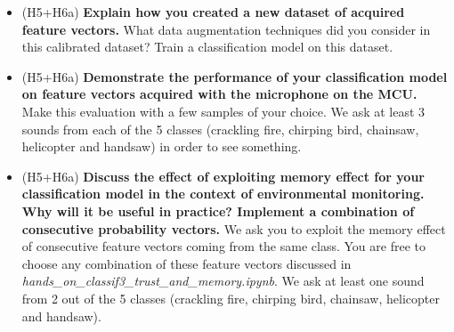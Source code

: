 \begin{itemize}
\begin{enumerate}
    \item acquired via the microphone on the MCU.
   \end{enumerate}
   To help this comparison, we advise you to show the whole melspectrogram on the 5s-long audio signal in Python, and to identify in this whole melspectrogram what is the subpart that is the most related to your acquired melspectrogram with the Nucleo board.
     Use \textbf{a few} representative samples of the dataset to conduct your experiments.
       We ask, for each sample, a (1,3) subplot showing the melspectrograms for cases 1,2,3 from left to right. Please make it clear with titles or captions in your figures.
    \item (H5+H6a) \textbf{Explain how you created a new dataset of acquired feature vectors.} What data augmentation techniques did you consider in this calibrated dataset? Train a classification model on this dataset.
    \item (H5+H6a) \textbf{Demonstrate the performance of your classification model on feature vectors acquired with the microphone on the MCU.}
    Make this evaluation with a few samples of your choice. We ask at least 3 sounds from each of the 5 classes (crackling fire, chirping bird, chainsaw, helicopter and handsaw) in order to see something.
    \item (H5+H6a) \textbf{Discuss the effect of exploiting memory effect for your classification model in the context of environmental monitoring. Why will it be useful in practice? Implement a combination of consecutive probability vectors.} We ask you to exploit the memory effect of consecutive feature vectors coming from the same class. You are free to choose any combination of these feature vectors discussed in \emph{hands\_on\_classif3\_trust\_and\_memory.ipynb}. We ask at least one sound from 2 out of the 5 classes (crackling fire, chirping bird, chainsaw, helicopter and handsaw).
\end{itemize}
